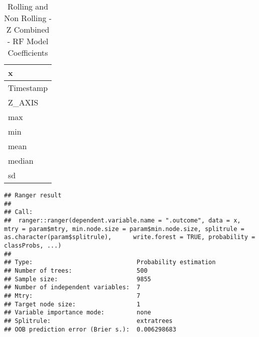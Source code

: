 \documentclass[]{article}
\begin{document}
\begin{table}[!h]

\caption{\label{tab:sensor-z-combined-rolling-rf-params}Rolling and Non Rolling - Z Combined - RF Model Coefficients}
\centering
\begin{tabular}[t]{l}
\toprule
x\\
\midrule
Timestamp\\
Z\_AXIS\\
max\\
min\\
mean\\
\addlinespace
median\\
sd\\
\bottomrule
\end{tabular}
\end{table}

\begin{verbatim}
## Ranger result
## 
## Call:
##  ranger::ranger(dependent.variable.name = ".outcome", data = x,      mtry = param$mtry, min.node.size = param$min.node.size, splitrule = as.character(param$splitrule),      write.forest = TRUE, probability = classProbs, ...) 
## 
## Type:                             Probability estimation 
## Number of trees:                  500 
## Sample size:                      9855 
## Number of independent variables:  7 
## Mtry:                             7 
## Target node size:                 1 
## Variable importance mode:         none 
## Splitrule:                        extratrees 
## OOB prediction error (Brier s.):  0.006298683
\end{verbatim}
\end{document}
